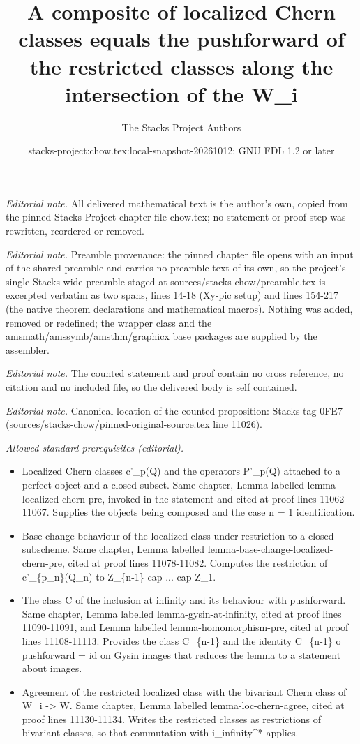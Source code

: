 \documentclass[10pt,a4paper]{amsart}
\title{A composite of localized Chern classes equals the pushforward of the restricted classes along the intersection of the W\_i}
\author{The Stacks Project Authors}
\date{stacks-project:chow.tex:local-snapshot-20261012; GNU FDL 1.2 or later}
\theoremstyle{plain}
\theoremstyle{definition}
\theoremstyle{remark}
\numberwithin{equation}{subsection}
\begin{document}
\maketitle
\noindent\textit{Editorial note.} All delivered mathematical text is the author's own, copied from the pinned Stacks Project chapter file chow.tex; no statement or proof step was rewritten, reordered or removed.\par\medskip
\noindent\textit{Editorial note.} Preamble provenance: the pinned chapter file opens with an input of the shared preamble and carries no preamble text of its own, so the project's single Stacks-wide preamble staged at sources/stacks-chow/preamble.tex is excerpted verbatim as two spans, lines 14-18 (Xy-pic setup) and lines 154-217 (the native theorem declarations and mathematical macros). Nothing was added, removed or redefined; the wrapper class and the amsmath/amssymb/amsthm/graphicx base packages are supplied by the assembler.\par\medskip
\noindent\textit{Editorial note.} The counted statement and proof contain no cross reference, no citation and no included file, so the delivered body is self contained.\par\medskip
\noindent\textit{Editorial note.} Canonical location of the counted proposition: Stacks tag 0FE7 (sources/stacks-chow/pinned-original-source.tex line 11026).\par\medskip
\noindent\textit{Allowed standard prerequisites (editorial).}\begin{itemize}
\item Localized Chern classes c'\_p(Q) and the operators P'\_p(Q) attached to a perfect object and a closed subset. Same chapter, Lemma labelled lemma-localized-chern-pre, invoked in the statement and cited at proof lines 11062-11067. Supplies the objects being composed and the case n = 1 identification.
\item Base change behaviour of the localized class under restriction to a closed subscheme. Same chapter, Lemma labelled lemma-base-change-localized-chern-pre, cited at proof lines 11078-11082. Computes the restriction of c'\_\{p\_n\}(Q\_n) to Z\_\{n-1\} cap ... cap Z\_1.
\item The class C of the inclusion at infinity and its behaviour with pushforward. Same chapter, Lemma labelled lemma-gysin-at-infinity, cited at proof lines 11090-11091, and Lemma labelled lemma-homomorphism-pre, cited at proof lines 11108-11113. Provides the class C\_\{n-1\} and the identity C\_\{n-1\} o pushforward = id on Gysin images that reduces the lemma to a statement about images.
\item Agreement of the restricted localized class with the bivariant Chern class of W\_i -> W. Same chapter, Lemma labelled lemma-loc-chern-agree, cited at proof lines 11130-11134. Writes the restricted classes as restrictions of bivariant classes, so that commutation with i\_infinity\textasciicircum{}* applies.
\end{itemize}\medskip
\end{document}
